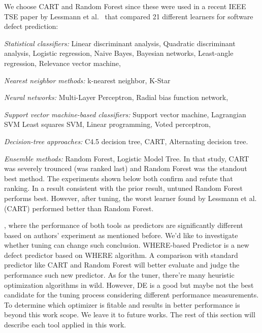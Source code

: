 We choose CART and Random Forest since  these were used in 
a recent IEEE TSE paper by Lessmann et al.~\cite{lessmann2008benchmarking} that compared 21 different 
learners for software defect prediction:
\bi
\item
{\em Statistical classifiers:}
Linear    discriminant analysis,
Quadratic discriminant analysis,
Logistic regression,
Naive Bayes,
Bayesian networks,
Least-angle regression,
Relevance vector machine,

\item
{\em Nearest neighbor methods:}
k-nearest neighbor,
K-Star

\item
{\em Neural networks:}
Multi-Layer Perceptron,
Radial bias function network,

\item
{\em Support vector machine-based classifiers:}
Support vector machine,
Lagrangian SVM
Least squares SVM,
Linear programming,
Voted perceptron,

\item
{\em Decision-tree approaches:}
C4.5 decision tree,
CART,
Alternating decision tree.
\item
{\em Ensemble methods:}
Random Forest,
Logistic Model Tree.
\ei
In that study, CART was severely trounced (was ranked last) and Random Forest was
the standout best method. The experiments shown below both confirm and refute
that ranking. In a result consistent with the prior result, untuned Random Forest performs best.
However, after tuning, the worst learner found by Lessmann et al. (CART) performed better
than Random Forest.

, where the performance of both tools as predictors are 
significantly different based on authors' experiment as mentioned before. We'd like to 
investigate whether tuning can change such conclusion. WHERE-based Predictor is a new 
defect predictor based on WHERE\cite{menzies2013local} algorithm. A comparison with 
standard predictor like CART and Random Forest will better evaluate and judge the 
performance such new predictor. As for the tuner, there're many heuristic optimization 
algorithms in wild. However, DE is a good but maybe not the best candidate for the tuning 
process considering different performance measurements. To determine which optimizer is 
fitable and results in better performance is beyond this work scope. We leave it to future 
works. The rest of this section will describe each tool applied in this work.



